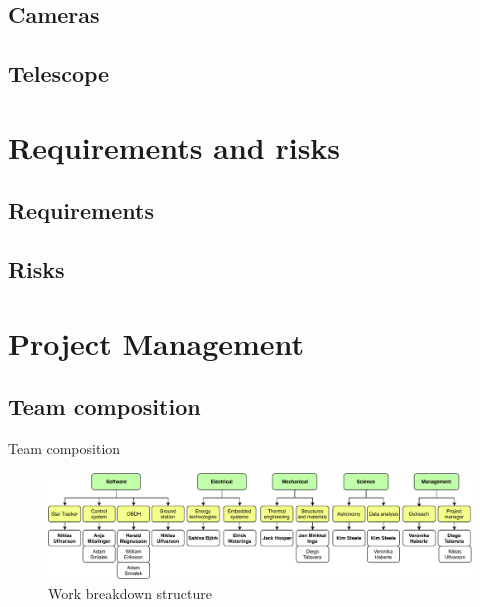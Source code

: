 \documentclass[11pt, aspectratio=169]{beamer}
\begin{document}
\subsection{Cameras}
\subsection{Telescope}

\section{Requirements and risks}
\subsection{Requirements}
\subsection{Risks}

\section{Project Management}
\subsection{Team composition}
\begin{frame}{Team composition}
    \begin{figure}
        \includegraphics[width=\linewidth]{images/Team_structure.pdf}
        \caption{Work breakdown structure}
    \end{figure}
\end{frame}
\end{document}
